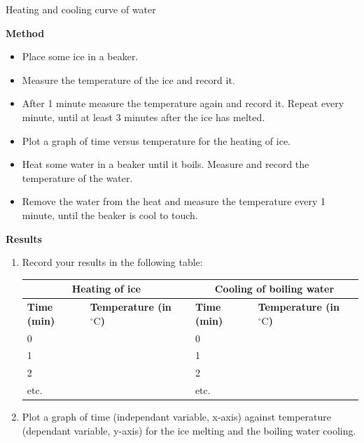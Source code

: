 \begin{f_experiment}{Heating and cooling curve of water}
{\label{m38736*eip-862}\noindent{}\textbf{Method}
\label{m38736*id9872}\begin{itemize}[noitemsep]
            \item Place some ice in a beaker.
\item Measure the temperature of the ice and record it.
\item After 1 minute measure the temperature again and record it. Repeat every minute, until at least 3 minutes after the ice has melted.
\item Plot a graph of time versus temperature for the heating of ice.
\item Heat some water in a beaker until it boils. Measure and record the temperature of the water.
\item Remove the water from the heat and measure the temperature every 1 minute, until the beaker is cool to touch.
\end{itemize}
\label{m38736*eip-282}
      \label{m38736*eip-863}\noindent{}\textbf{Results} \\
\begin{enumerate}[noitemsep, label=\textbf{\arabic*}.]
\item Record your results in the following table: 
          \begin{table}[H]
        \begin{center}
      \label{m38736*uid434}
    \noindent
      \begin{tabular}{|l|l|l|l|}\hline
\multicolumn{2}{|c|}{Heating of ice} & \multicolumn{2}{c|}{Cooling of boiling water}  \\ \hline
 \textbf{Time (min)} & \textbf{Temperature (in $^{\circ} \text{C}$)} &  \textbf{Time (min)} & \textbf{Temperature (in $^{\circ} \text{C}$)} \\ \hline
     0    & & 0    & \\ \hline 
     1    & & 1    & \\ \hline
     2    & & 2    & \\ \hline
     etc. & & etc. & \\ \hline
    \end{tabular}
      \end{center}
\end{table}
\item Plot a graph of time (independant variable, x-axis) against temperature (dependant variable, y-axis) for the ice melting and the boiling water cooling. 
\end{enumerate}
 
}
\end{f_experiment}
